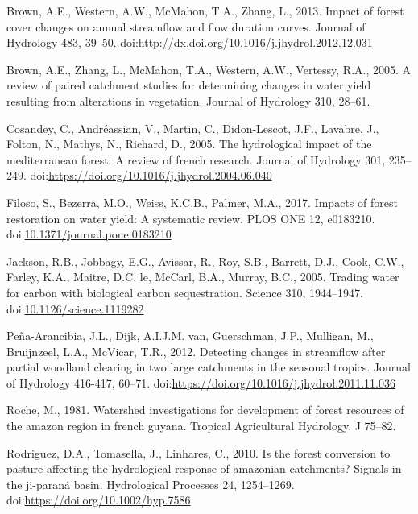 \documentclass[]{elsarticle} %
\begin{document}
\leavevmode\hypertarget{ref-brown2013}{}%
Brown, A.E., Western, A.W., McMahon, T.A., Zhang, L., 2013. Impact of
forest cover changes on annual streamflow and flow duration curves.
Journal of Hydrology 483, 39--50.
doi:\href{https://doi.org/http://dx.doi.org/10.1016/j.jhydrol.2012.12.031}{http://dx.doi.org/10.1016/j.jhydrol.2012.12.031}

\leavevmode\hypertarget{ref-brown2005}{}%
Brown, A.E., Zhang, L., McMahon, T.A., Western, A.W., Vertessy, R.A.,
2005. A review of paired catchment studies for determining changes in
water yield resulting from alterations in vegetation. Journal of
Hydrology 310, 28--61.

\leavevmode\hypertarget{ref-cosandey2005}{}%
Cosandey, C., Andréassian, V., Martin, C., Didon-Lescot, J.F., Lavabre,
J., Folton, N., Mathys, N., Richard, D., 2005. The hydrological impact
of the mediterranean forest: A review of french research. Journal of
Hydrology 301, 235--249.
doi:\href{https://doi.org/https://doi.org/10.1016/j.jhydrol.2004.06.040}{https://doi.org/10.1016/j.jhydrol.2004.06.040}

\leavevmode\hypertarget{ref-filoso2017}{}%
Filoso, S., Bezerra, M.O., Weiss, K.C.B., Palmer, M.A., 2017. Impacts of
forest restoration on water yield: A systematic review. PLOS ONE 12,
e0183210.
doi:\href{https://doi.org/10.1371/journal.pone.0183210}{10.1371/journal.pone.0183210}

\leavevmode\hypertarget{ref-jackson2005}{}%
Jackson, R.B., Jobbagy, E.G., Avissar, R., Roy, S.B., Barrett, D.J.,
Cook, C.W., Farley, K.A., Maitre, D.C. le, McCarl, B.A., Murray, B.C.,
2005. Trading water for carbon with biological carbon sequestration.
Science 310, 1944--1947.
doi:\href{https://doi.org/10.1126/science.1119282}{10.1126/science.1119282}

\leavevmode\hypertarget{ref-pena-arancibia2012}{}%
Peña-Arancibia, J.L., Dijk, A.I.J.M. van, Guerschman, J.P., Mulligan,
M., Bruijnzeel, L.A., McVicar, T.R., 2012. Detecting changes in
streamflow after partial woodland clearing in two large catchments in
the seasonal tropics. Journal of Hydrology 416-417, 60--71.
doi:\href{https://doi.org/https://doi.org/10.1016/j.jhydrol.2011.11.036}{https://doi.org/10.1016/j.jhydrol.2011.11.036}

\leavevmode\hypertarget{ref-roche1981}{}%
Roche, M., 1981. Watershed investigations for development of forest
resources of the amazon region in french guyana. Tropical Agricultural
Hydrology. J 75--82.

\leavevmode\hypertarget{ref-rodriguez2010}{}%
Rodriguez, D.A., Tomasella, J., Linhares, C., 2010. Is the forest
conversion to pasture affecting the hydrological response of amazonian
catchments? Signals in the ji-paraná basin. Hydrological Processes 24,
1254--1269.
doi:\href{https://doi.org/https://doi.org/10.1002/hyp.7586}{https://doi.org/10.1002/hyp.7586}
\end{document}
